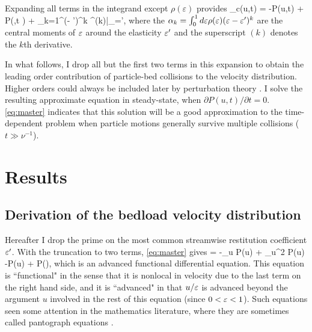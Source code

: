 \DIFaddend Expanding all terms in the integrand except $\rho(\varepsilon)$ provides
\be \DIFdelbegin {}\DIFdelend \DIFaddbegin {}\DIFaddend _c(u,t) = -P(u,t) + P\big(,t \big) + \sum_{k=1}^\infty {}(\ve - \ve')^k ^{(k)}\Big|_{\ve=\ve'},\label{eq:expansion}\ee
where the $\alpha_k = \int_0^1 d\varepsilon \rho(\varepsilon) (\varepsilon-\varepsilon')^k $ are the central moments of $\varepsilon$ around the \DIFdelbegin {}\DIFdelend \DIFaddbegin {}\DIFaddend elasticity $\varepsilon'$ and the superscript $(k)$ denotes the $k$th derivative.

In what follows, I drop all but the first two terms in this expansion to obtain the leading order contribution of particle-bed collisions to the velocity distribution.
Higher orders could always be included later by perturbation theory \DIFdelbegin {}\DIFdelend \DIFaddbegin {}\DIFaddend .
I solve the resulting approximate equation in steady-state, when $\partial P(u,t)/\partial t = 0$. \DIFdelbegin {}\DIFdelend \DIFaddbegin {}\DIFaddend \ref{eq:master} indicates that this solution will be a good approximation to the time-dependent problem when particle motions generally survive multiple collisions ($t\gg \nu^{-1}$).

\section{Results}
\label{sec:langresults}

\subsection{Derivation of the bedload velocity distribution}
\label{sec:langsolution}
Hereafter I drop the prime on the most common streamwise restitution coefficient $\varepsilon'$.
With the truncation to two terms, \DIFdelbegin {}\DIFdelend \DIFaddbegin {}\DIFaddend \ref{eq:master} gives 
 = -\tilde{\Gamma}\partial_u P(u) + \partial_u^2 P(u) -P(u) +  P\big(\big),\label{eq:governer} \ee
which is an advanced functional differential equation. This equation is ``functional" in the sense that it is nonlocal in velocity due to the last term on the right hand side, and it is ``advanced" in that $u/\varepsilon$ is advanced beyond the argument $u$ involved in the rest of this equation (since $0<\varepsilon<1$).
Such equations \DIFaddbegin {}\DIFaddend seen some attention in the mathematics literature, where they are sometimes called pantograph equations \citep{Hall1989, Kim1998,Zaidi2015}.

